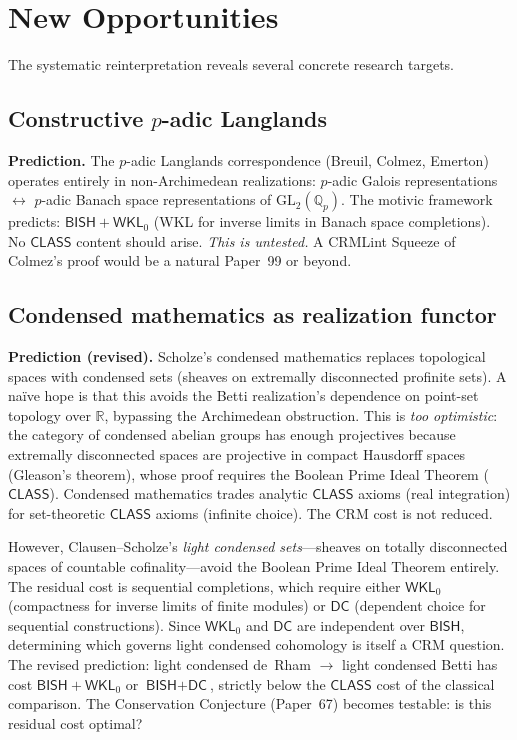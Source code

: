 \documentclass[11pt,a4paper]{article}
\theoremstyle{plain}
\theoremstyle{definition}
\newcommand{\BISH}{\textsf{BISH}}
\newcommand{\WKL}{\textsf{WKL}_0}
\newcommand{\DC}{\textsf{DC}}
\newcommand{\CLASS}{\textsf{CLASS}}
\newcommand{\Q}{\mathbb{Q}}
\newcommand{\R}{\mathbb{R}}
\newcommand{\GL}{\mathrm{GL}}
\begin{document}
\section{New Opportunities}\label{app:opportunities}

The systematic reinterpretation reveals several concrete research targets.

\subsection{Constructive $p$-adic Langlands}

\textbf{Prediction.} The $p$-adic Langlands correspondence (Breuil, Colmez, Emerton) operates entirely in non-Archimedean realizations: $p$-adic Galois representations $\leftrightarrow$ $p$-adic Banach space representations of $\GL_2(\Q_p)$. The motivic framework predicts: $\BISH + \WKL$ (WKL for inverse limits in Banach space completions). No $\CLASS$ content should arise. \emph{This is untested.} A CRMLint Squeeze of Colmez's proof would be a natural Paper~99 or beyond.

\subsection{Condensed mathematics as realization functor}

\textbf{Prediction (revised).} Scholze's condensed mathematics replaces topological spaces with condensed sets (sheaves on extremally disconnected profinite sets). A na\"ive hope is that this avoids the Betti realization's dependence on point-set topology over $\R$, bypassing the Archimedean obstruction. This is \emph{too optimistic}: the category of condensed abelian groups has enough projectives because extremally disconnected spaces are projective in compact Hausdorff spaces (Gleason's theorem), whose proof requires the Boolean Prime Ideal Theorem ($\CLASS$). Condensed mathematics trades analytic $\CLASS$ axioms (real integration) for set-theoretic $\CLASS$ axioms (infinite choice). The CRM cost is not reduced.

However, Clausen--Scholze's \emph{light condensed sets}---sheaves on totally disconnected spaces of countable cofinality---avoid the Boolean Prime Ideal Theorem entirely. The residual cost is sequential completions, which require either $\WKL$ (compactness for inverse limits of finite modules) or $\DC$ (dependent choice for sequential constructions). Since $\WKL$ and $\DC$ are independent over $\BISH$, determining which governs light condensed cohomology is itself a CRM question. The revised prediction: light condensed de~Rham $\to$ light condensed Betti has cost $\BISH + \WKL$ or $\BISH + \DC$, strictly below the $\CLASS$ cost of the classical comparison. The Conservation Conjecture (Paper~67) becomes testable: is this residual cost optimal?
\end{document}
